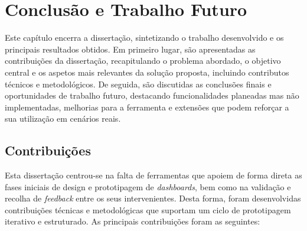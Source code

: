 
%

\chapter{Conclusão e Trabalho Futuro}
\label{cha:cap6_conclusao}

Este capítulo encerra a dissertação, sintetizando o trabalho desenvolvido e os principais resultados obtidos. Em primeiro lugar, são apresentadas as contribuições da dissertação, recapitulando o problema abordado, o objetivo central e os aspetos mais relevantes da solução proposta, incluindo contributos técnicos e metodológicos. De seguida, são discutidas as conclusões finais e oportunidades de trabalho futuro, destacando funcionalidades planeadas mas não implementadas, melhorias para a ferramenta e extensões que podem reforçar a sua utilização em cenários reais.

\section{Contribuições}
\label{sec:cap6_contribuicoes}

Esta dissertação centrou-se na falta de ferramentas que apoiem de forma direta as fases iniciais de design e prototipagem de \textit{dashboards}, bem como na validação e recolha de \textit{feedback} entre os seus intervenientes. Desta forma, foram desenvolvidas contribuições técnicas e metodológicas que suportam um ciclo de prototipagem iterativo e estruturado. As principais contribuições foram as seguintes:

